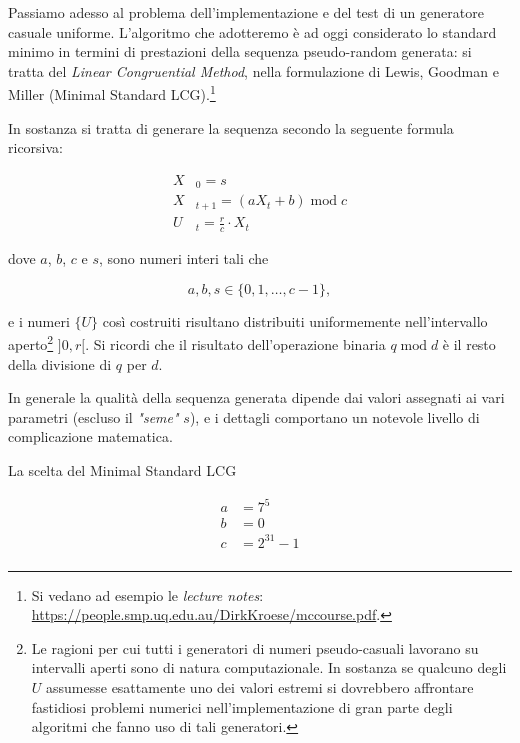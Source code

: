 \noindent Passiamo adesso al problema dell'implementazione e del test di un generatore casuale uniforme. L'algoritmo che adotteremo è ad oggi considerato lo standard minimo in termini di prestazioni della sequenza pseudo-random generata: si tratta del \emph{Linear Congruential Method}, nella formulazione di Lewis, Goodman e Miller (Minimal Standard LCG).\footnote{Si vedano ad esempio le \emph{lecture notes}: \url{https://people.smp.uq.edu.au/DirkKroese/mccourse.pdf}.}\\

\vfill

\noindent In sostanza si tratta di generare la sequenza secondo la seguente formula ricorsiva:

\begin{align*}
X&_0 = s\\
X&_{t+1} = (aX_t + b) \mathop{\mathrm{mod}}c\\
U&_{t} = \frac{r}{c} \cdot X_t
\end{align*}

\noindent dove $a$, $b$, $c$ e $s$, sono numeri interi tali che

$$ a, b, s \in \{0, 1, \dots, c-1\},$$

\noindent e i numeri $\{U\}$ così costruiti risultano distribuiti uniformemente nell'intervallo aperto\footnote{Le ragioni per cui tutti i generatori di numeri pseudo-casuali lavorano su intervalli aperti sono di natura computazionale. In sostanza se qualcuno degli $U$ assumesse esattamente uno dei valori estremi si dovrebbero affrontare fastidiosi problemi numerici nell'implementazione di gran parte degli algoritmi che fanno uso di tali generatori.} $]0,r[$. Si ricordi che il risultato dell'operazione binaria $q\mathop{\mathrm{mod}}d$ è il resto della divisione di $q$ per $d$.\\

\vfill

\noindent In generale la qualità della sequenza generata dipende dai valori assegnati ai vari parametri (escluso il \emph{"seme"} $s$), e i dettagli comportano un notevole livello di complicazione matematica.\\

\vfill

\noindent  La scelta del Minimal Standard LCG

\begin{align*}
a &= 7^5\\
b &= 0\\
c &= 2^{31}-1\\
\end{align*}

